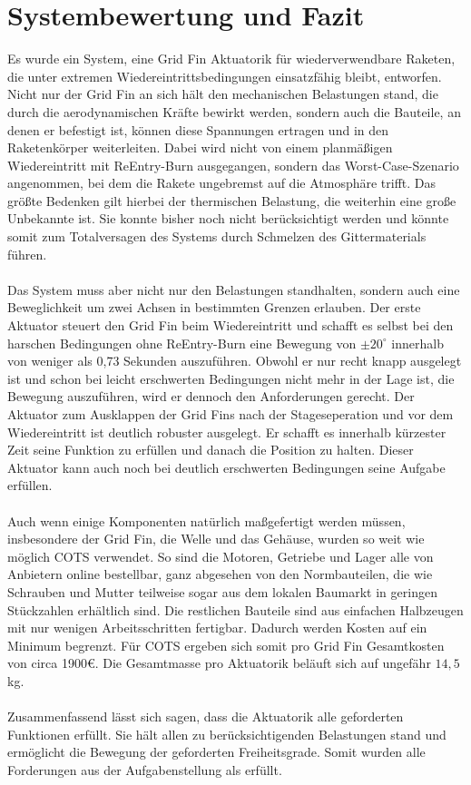 \section{Systembewertung und Fazit}
Es wurde ein System, eine Grid Fin Aktuatorik für wiederverwendbare Raketen, die unter extremen Wiedereintrittsbedingungen einsatzfähig bleibt, entworfen. Nicht nur der Grid Fin an sich hält den mechanischen Belastungen stand, die durch die aerodynamischen Kräfte bewirkt werden, sondern auch die Bauteile, an denen er befestigt ist, können diese Spannungen ertragen und in den Raketenkörper weiterleiten. Dabei wird nicht von einem planmäßigen Wiedereintritt mit ReEntry-Burn ausgegangen, sondern das Worst-Case-Szenario angenommen, bei dem die Rakete ungebremst auf die Atmosphäre trifft. Das größte Bedenken gilt hierbei der thermischen Belastung, die weiterhin eine große Unbekannte ist. Sie konnte bisher noch nicht berücksichtigt werden und könnte somit zum Totalversagen des Systems durch Schmelzen des Gittermaterials führen.
\\~\\
Das System muss aber nicht nur den Belastungen standhalten, sondern auch eine Beweglichkeit um zwei Achsen in bestimmten Grenzen erlauben. Der erste Aktuator steuert den Grid Fin beim Wiedereintritt und schafft es selbst bei den harschen Bedingungen ohne ReEntry-Burn eine Bewegung von $\pm 20^\circ$  innerhalb von weniger als 0,73 Sekunden auszuführen. Obwohl er nur recht knapp ausgelegt ist und schon bei leicht erschwerten Bedingungen nicht mehr in der Lage ist, die Bewegung auszuführen, wird er dennoch den Anforderungen gerecht. Der Aktuator zum Ausklappen der Grid Fins nach der Stageseperation und vor dem Wiedereintritt ist deutlich robuster ausgelegt. Er schafft es innerhalb kürzester Zeit seine Funktion zu erfüllen und danach die Position zu halten. Dieser Aktuator kann auch noch bei deutlich erschwerten Bedingungen seine Aufgabe erfüllen.
\\~\\
Auch wenn einige Komponenten natürlich maßgefertigt werden müssen, insbesondere der Grid Fin, die Welle und das Gehäuse, wurden so weit wie möglich COTS verwendet. So sind die Motoren, Getriebe und Lager alle von Anbietern online bestellbar, ganz abgesehen von den Normbauteilen, die wie Schrauben und Mutter teilweise sogar aus dem lokalen Baumarkt in geringen Stückzahlen erhältlich sind. Die restlichen Bauteile sind aus einfachen Halbzeugen mit nur wenigen Arbeitsschritten fertigbar. Dadurch werden Kosten auf ein Minimum begrenzt. Für COTS ergeben sich somit pro Grid Fin Gesamtkosten von circa 1900€. Die Gesamtmasse pro Aktuatorik beläuft sich auf ungefähr $14,5$kg.
\\~\\
Zusammenfassend lässt sich sagen, dass die Aktuatorik alle geforderten Funktionen erfüllt. Sie hält allen zu berücksichtigenden Belastungen stand und ermöglicht die Bewegung der geforderten Freiheitsgrade. Somit wurden alle Forderungen aus der Aufgabenstellung als erfüllt.
